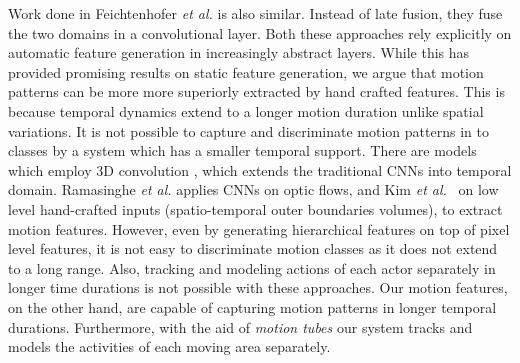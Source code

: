 Work done in Feichtenhofer \textit{et al.}\cite{feichtenhofer2016convolutional} is also similar. Instead of late fusion,
they fuse the two domains in a convolutional layer. Both these approaches rely explicitly on automatic feature
generation in increasingly abstract layers. While this has provided promising results on static feature generation,
we argue that motion patterns can be more more superiorly extracted by hand crafted features. This is because
temporal dynamics extend to a longer motion duration unlike spatial variations. It is not possible
to capture and discriminate motion patterns in to classes by a system which has a smaller temporal support. There are models
which employ 3D convolution \cite{ji20133d, tran2015learning}, which extends the traditional CNNs into temporal domain.
Ramasinghe \textit{et al.}\cite{7486474} applies CNNs on optic flows, and Kim \textit{et al.}~\cite{kim2007human} on low level hand-crafted inputs
(spatio-temporal outer boundaries volumes), to extract motion features. However, even by generating hierarchical
features on top of pixel level features, it is not easy to discriminate motion classes as it does not extend to a long range.
Also, tracking and modeling actions of each actor separately in longer time durations is not possible with these
approaches. Our motion features, on the other hand, are capable of capturing motion patterns in longer temporal durations.
Furthermore, with the aid of \textit{motion tubes} our system tracks and models the activities of each moving area separately.

